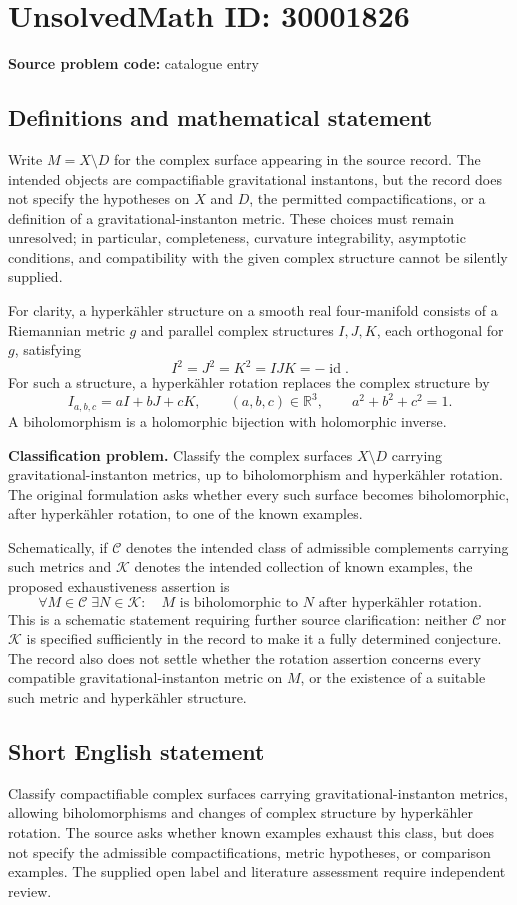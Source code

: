 \documentclass[11pt]{article}
\newcommand{\R}{\mathbb{R}}
\begin{document}
\section*{UnsolvedMath ID: 30001826}
\textbf{Source problem code:} catalogue entry
\subsection{Definitions and mathematical statement}
Write \(M=X\setminus D\) for the complex surface appearing in the source record. The intended objects are compactifiable gravitational instantons, but the record does not specify the hypotheses on \(X\) and \(D\), the permitted compactifications, or a definition of a gravitational-instanton metric. These choices must remain unresolved; in particular, completeness, curvature integrability, asymptotic conditions, and compatibility with the given complex structure cannot be silently supplied.

For clarity, a hyperkähler structure on a smooth real four-manifold consists of a Riemannian metric \(g\) and parallel complex structures \(I,J,K\), each orthogonal for \(g\), satisfying
\[
I^2=J^2=K^2=IJK=-\operatorname{id}.
\]
For such a structure, a hyperkähler rotation replaces the complex structure by
\[
I_{a,b,c}=aI+bJ+cK,
\qquad (a,b,c)\in\R^3,\qquad a^2+b^2+c^2=1.
\]
A biholomorphism is a holomorphic bijection with holomorphic inverse.

\textbf{Classification problem.} Classify the complex surfaces \(X\setminus D\) carrying gravitational-instanton metrics, up to biholomorphism and hyperkähler rotation. The original formulation asks whether every such surface becomes biholomorphic, after hyperkähler rotation, to one of the known examples.

Schematically, if \(\mathcal C\) denotes the intended class of admissible complements carrying such metrics and \(\mathcal K\) denotes the intended collection of known examples, the proposed exhaustiveness assertion is
\[
\forall M\in\mathcal C\;\exists N\in\mathcal K:\quad
M\text{ is biholomorphic to }N\text{ after hyperkähler rotation}.
\]
This is a schematic statement requiring further source clarification: neither \(\mathcal C\) nor \(\mathcal K\) is specified sufficiently in the record to make it a fully determined conjecture. The record also does not settle whether the rotation assertion concerns every compatible gravitational-instanton metric on \(M\), or the existence of a suitable such metric and hyperkähler structure.
\subsection{Short English statement}
Classify compactifiable complex surfaces carrying gravitational-instanton metrics, allowing biholomorphisms and changes of complex structure by hyperkähler rotation. The source asks whether known examples exhaust this class, but does not specify the admissible compactifications, metric hypotheses, or comparison examples. The supplied open label and literature assessment require independent review.
\end{document}
